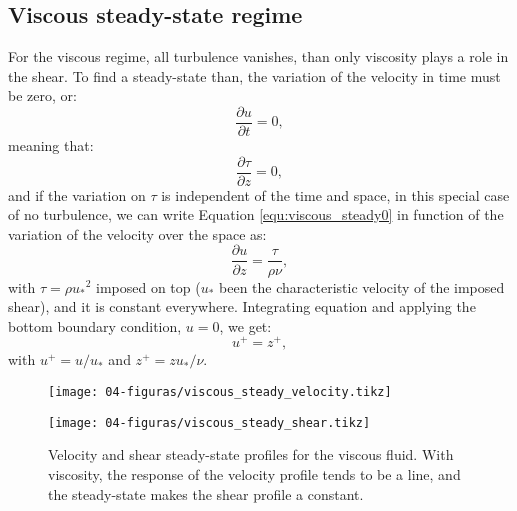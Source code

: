 \subsection{Viscous steady-state regime}
\label{sec:viscous_steady}
    For the viscous regime, all turbulence vanishes, than only viscosity plays a role in the shear. To find a steady-state than, the variation of the velocity in time must be zero, or:
    \begin{equation}
        \frac{\partial u}{\partial t} = 0,
        \label{equ:dudt0}
    \end{equation}
meaning that:
    \begin{equation}
        \frac{\partial \tau}{\partial z} = 0,
        \label{equ:dtaudz0}
    \end{equation}
and if the variation on $\tau$ is independent of the time and space, in this special case of no turbulence, we can write Equation \ref{equ:viscous_steady0} in function of the variation of the velocity over the space as:
    \begin{equation}
        \frac{\partial u}{\partial z} = \frac{\tau}{\rho \nu},
        \label{equ:viscous_steady0}
    \end{equation}
with $\tau = \rho {u_{*}}^{2}$ imposed on top ($u_{*}$ been the characteristic velocity of the imposed shear), and it is constant everywhere. Integrating equation and applying the bottom boundary condition, $u=0$, we get:
    \begin{equation}
        u^+ = z^+,
        \label{equ:viscous_steady1}
    \end{equation}
with $u^+ = u/u_{*}$ and $z^+ = z u_{*}/\nu$.

\begin{figure}[H]
    \centering
    \parbox{0.495\textwidth}{
        \centering
        \texttt{[image: 04-figuras/viscous\_steady\_velocity.tikz]}
        \label{fig:viscous_steady_velocity}
    }
    \parbox{0.495\textwidth}{
        \centering
        \texttt{[image: 04-figuras/viscous\_steady\_shear.tikz]}
        \label{fig:viscous_steady_shear}
    }
    \caption[Steady-state analytical solution for viscous fluid profiles.]{Velocity and shear steady-state profiles for the viscous fluid. With viscosity, the response of the velocity profile tends to be a line, and the steady-state makes the shear profile a constant.}
    \label{fig:viscous_steady}
\end{figure}

